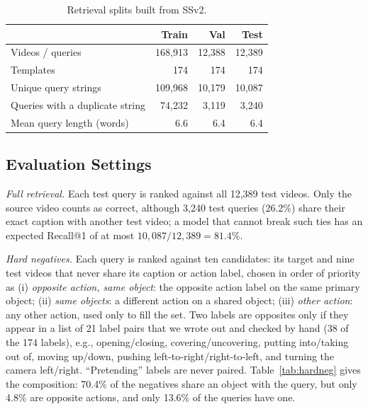 \documentclass[lettersize,journal]{IEEEtran}
\begin{document}
\begin{table}[!t]
\caption{Retrieval splits built from SSv2.}
\label{tab:data}
\centering
\begin{tabular}{lrrr}
\toprule
 & Train & Val & Test \\
\midrule
Videos / queries & 168{,}913 & 12{,}388 & 12{,}389 \\
Templates & 174 & 174 & 174 \\
Unique query strings & 109{,}968 & 10{,}179 & 10{,}087 \\
Queries with a duplicate string & 74{,}232 & 3{,}119 & 3{,}240 \\
Mean query length (words) & 6.6 & 6.4 & 6.4 \\
\bottomrule
\end{tabular}
\end{table}

\subsection{Evaluation Settings}
\emph{Full retrieval.} Each test query is ranked against all 12{,}389 test
videos. Only the source video counts as correct, although 3{,}240 test queries
(26.2\%) share their exact caption with another test video; a model that cannot
break such ties has an expected Recall@1 of at most
$10{,}087/12{,}389=81.4\%$.

\emph{Hard negatives.} Each query is ranked against ten candidates: its target
and nine test videos that never share its caption or action label, chosen in
order of priority as (i) \emph{opposite action, same object}: the opposite
action label on the same primary object; (ii) \emph{same objects}: a different
action on a shared object; (iii) \emph{other action}: any other action, used
only to fill the set. Two labels are opposites only if they appear in a list of
21 label pairs that we wrote out and checked by hand (38 of the 174 labels),
e.g., opening/closing, covering/uncovering, putting into/taking out of, moving
up/down, pushing left-to-right/right-to-left, and turning the camera left/right.
``Pretending'' labels are never paired. Table~\ref{tab:hardneg} gives the
composition: 70.4\% of the negatives share an object with the query, but only
4.8\% are opposite actions, and only 13.6\% of the queries have one.
\end{document}
